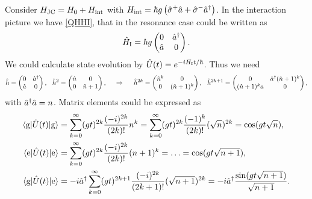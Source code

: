 Consider $H_{\textnormal{JC}} = H_0 + H_{\textnormal{int}}$ with $H_{\textnormal{int}} = \hbar g\left(\hat{\sigma}^+ \hat{a} + \hat{\sigma}^- \hat{a}^{\dag}\right)$. In the interaction picture we have \eqref{QHHI}, that in the resonance case could be written as
\begin{equation*}
	\hat{H}_{\textnormal{I}} = \hbar g \begin{pmatrix}
	    0 & \hat{a}^{\dag} \\
	   \hat{a} & 0 \\
	\end{pmatrix}.
\end{equation*}
We could calculate state evolution by $\hat{U}(t) = e^{- i H_{\textnormal{I}} t / \hbar}$.  Thus we need
\begin{equation*}
	\hat{h} = \begin{pmatrix}
	    0 & \hat{a}^{\dag} \\
	   \hat{a} & 0 \\
	\end{pmatrix},
	\hspace{2.5 mm} 
	\hat{h}^2 = \begin{pmatrix}
	    \hat{n} & 0 \\
	    0 & \hat{n}+1 \\
	\end{pmatrix},
	\hspace{0.5cm} \Rightarrow \hspace{0.5cm}
	\hat{h}^{2k} = \begin{pmatrix}
	    \hat{n}^k & 0 \\
	    0 & (\hat{n}+1)^k \\
	\end{pmatrix},
	\hspace{2.5 mm} 
	\hat{h}^{2k+1} = 
	\begin{pmatrix}
	    0 &  \hat{a}^{\dag} (\hat{n}+1)^k \\
	    (\hat{n}+1)^k a & 0 \\
	\end{pmatrix},
\end{equation*}
with $\hat{a}^{\dag} \hat{a} = n$. Matrix elements could be expressed as
\begin{align*}
	\bk{\text{g}}[\hat{U}(t)]{\text{g}} &= \sum_{k=0}^{\infty} (gt)^{2k}\frac{(-i)^{2k}}{(2k)!} n^k = \sum_{k=0}^{\infty} (gt)^{2k} \frac{(-1)^{k}}{(2k)!} (\sqrt{n})^{2k} = \cos(gt \sqrt{n}), \\
	\bk{\text{e}}[\hat{U}(t)]{\text{e}} &= \sum_{k=0}^{\infty} (gt)^{2k}\frac{(-i)^{2k}}{(2k)!} (n+1)^k = \ldots = \cos(gt \sqrt{n+1}), \\
	\bk{\text{g}}[\hat{U}(t)]{\text{e}} &= -i\hat{a}\D\sum_{k=0}^{\infty} (gt)^{2k+1}\frac{(-i)^{2k}}{(2k+1)!} (\sqrt{n+1})^{2k} = -i \hat{a}\D \frac{\sin(gt \sqrt{n+1})}{\sqrt{n+1}}.
\end{align*}

